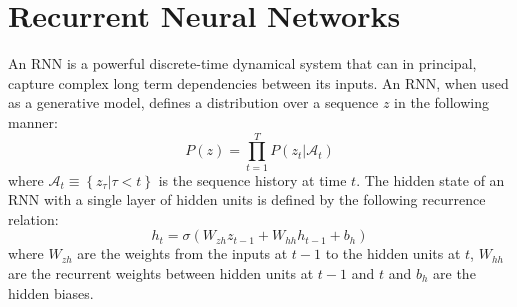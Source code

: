 \documentclass{article}
\begin{document}




\section{Recurrent Neural Networks}
\label{sec:format}
An RNN is a powerful discrete-time dynamical system that can in principal, capture complex long term dependencies between its inputs. An RNN, when used as a generative model, defines a distribution over a sequence $z$ in the following manner:
\begin{equation}
P(z) = \prod_{t=1}^{T} P(z_t|\mathcal A_t)
\end{equation} where $\mathcal A_t \equiv \left\{ z_{\tau} | \tau < t \right\}$ is the sequence history at time $t$. The hidden state of an RNN with a single layer of hidden units is defined by the following recurrence relation:
\begin{equation}
h_t = \sigma(W_{zh}z_{t-1} + W_{hh}h_{t-1} + b_{h})
\end{equation} where $W_{zh}$ are the weights from the inputs at $t-1$ to the hidden units at $t$, $W_{hh}$ are the recurrent weights between hidden units at $t-1$ and $t$ and $b_h$ are the hidden biases. 
\end{document}
